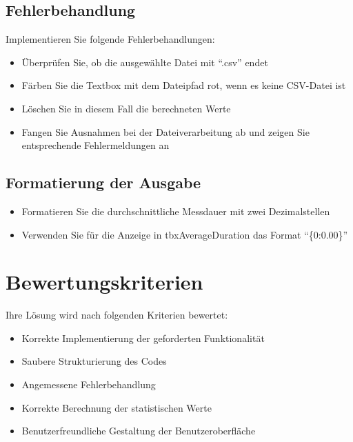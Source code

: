 \documentclass[a4paper,11pt]{article}
\begin{document}
\subsection{Fehlerbehandlung}
Implementieren Sie folgende Fehlerbehandlungen:
\begin{itemize}
    \item Überprüfen Sie, ob die ausgewählte Datei mit ``.csv'' endet
    \item Färben Sie die Textbox mit dem Dateipfad rot, wenn es keine CSV-Datei ist
    \item Löschen Sie in diesem Fall die berechneten Werte
    \item Fangen Sie Ausnahmen bei der Dateiverarbeitung ab und zeigen Sie entsprechende Fehlermeldungen an
\end{itemize}

\subsection{Formatierung der Ausgabe}
\begin{itemize}
    \item Formatieren Sie die durchschnittliche Messdauer mit zwei Dezimalstellen
    \item Verwenden Sie für die Anzeige in tbxAverageDuration das Format ``\{0:0.00\}''
\end{itemize}

\section{Bewertungskriterien}
Ihre Lösung wird nach folgenden Kriterien bewertet:
\begin{itemize}
    \item Korrekte Implementierung der geforderten Funktionalität
    \item Saubere Strukturierung des Codes
    \item Angemessene Fehlerbehandlung
    \item Korrekte Berechnung der statistischen Werte
    \item Benutzerfreundliche Gestaltung der Benutzeroberfläche
\end{itemize}
\end{document}
